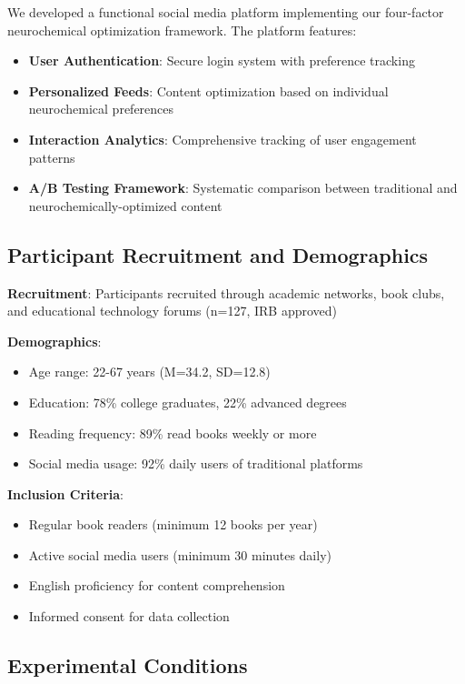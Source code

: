 \documentclass[11pt,letterpaper]{article}
\begin{document}
We developed a functional social media platform implementing our four-factor neurochemical optimization framework. The platform features:

\begin{itemize}
    \item \textbf{User Authentication}: Secure login system with preference tracking
    \item \textbf{Personalized Feeds}: Content optimization based on individual neurochemical preferences
    \item \textbf{Interaction Analytics}: Comprehensive tracking of user engagement patterns
    \item \textbf{A/B Testing Framework}: Systematic comparison between traditional and neurochemically-optimized content
\end{itemize}

\subsection{Participant Recruitment and Demographics}

\textbf{Recruitment}: Participants recruited through academic networks, book clubs, and educational technology forums (n=127, IRB approved)

\textbf{Demographics}:
\begin{itemize}
    \item Age range: 22-67 years (M=34.2, SD=12.8)
    \item Education: 78\% college graduates, 22\% advanced degrees
    \item Reading frequency: 89\% read books weekly or more
    \item Social media usage: 92\% daily users of traditional platforms
\end{itemize}

\textbf{Inclusion Criteria}:
\begin{itemize}
    \item Regular book readers (minimum 12 books per year)
    \item Active social media users (minimum 30 minutes daily)
    \item English proficiency for content comprehension
    \item Informed consent for data collection
\end{itemize}

\subsection{Experimental Conditions}
\end{document}
